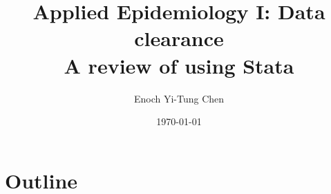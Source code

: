 

\title[Applied Epi I: Data clearance]{Applied Epidemiology I: Data clearance\\ A review of using Stata}
\date{\today}
\author[Enoch Yi-Tung Chen]{Enoch Yi-Tung Chen}




\begin{frame}
\maketitle 
\end{frame}



\section*{Outline}
\begin{frame}{\secname}
 \begin{columns}[t]
        \begin{column}{.5\textwidth}
            \tableofcontents[sections={1-4}]
        \end{column}
        \begin{column}{.5\textwidth}
            \tableofcontents[sections={5-7}]
        \end{column}
\end{columns}
\end{frame}

